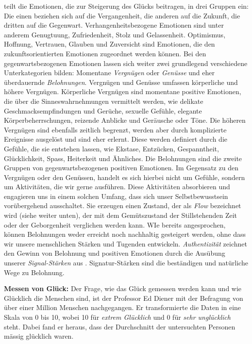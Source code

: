  teilt die Emotionen, die zur Steigerung des Glücks beitragen, in drei Gruppen ein: Die einen beziehen sich auf die Vergangenheit, die anderen auf die Zukunft, die dritten auf die Gegenwart. Verhangenheitsbezogene Emotionen sind unter anderem Genugtuung, Zufriedenheit, Stolz und Gelassenheit. Optimismus, Hoffnung, Vertrauen, Glauben und Zuversicht sind Emotionen, die den zukunftsorientierten Emotionen zugeordnet werden können. Bei den gegenwartsbezogenen Emotionen lassen sich weiter zwei grundlegend verschiedene Unterkategorien bilden: Momentane \textit{Vergnügen} oder \textit{Genüsse} und eher überdauernde \textit{Belohnungen}. Vergnügen und Genüsse umfassen körperliche und höhere Vergnügen. Körperliche Vergnügen sind momentane positive Emotionen, die über die Sinneswahrnehmungen vermittelt werden, wie delikate Geschmacksempfindungen und Gerüche, sexuelle Gefühle, elegante Körperbeherrschungen, reizende Anblicke und Geräusche oder Töne. Die höheren Vergnügen sind ebenfalls zeitlich begrenzt, werden aber durch komplizierte Ereignisse ausgelöst und sind eher erlernt. Diese werden definiert durch die Gefühle, die sie entstehen lassen, wie Ekstase, Entzücken, Gespanntheit, Glücklichkeit, Spass, Heiterkeit und Ähnliches. Die Belohnungen sind die zweite Gruppen von gegenwartsbezogenen positiven Emotionen. Im Gegensatz zu den Vergnügen oder den Genüssen, handelt es sich hierbei nicht um Gefühle, sondern um Aktivitäten, die wir gerne ausführen. Diese Aktivitäten absorbieren und engagieren uns in einem solchen Umfang, dass sich unser Selbstbewusstsein vorübergehend ausschaltet. Sie erzeugen einen Zustand, der als \textit{Flow} bezeichnet wird (siehe weiter unten), der mit dem Gemütszustand der Stillstehenden Zeit oder der Geborgenheit verglichen werden kann. WIe bereits angesprochen, können Belohnungen weder erreicht noch nachhaltig gesteigert werden, ohne dass wir unsere menschlichen Stärken und Tugenden entwickeln. \textit{Authentizität} zeichnet den Gewinn von Belohnung und positiven Emotionen durch die Ausübung unserer \textit{Signal-Stärken} aus \cite{Seligman2003}. Signatur-Stärken sind die beständigen und natürliche Wege zu Belohnung.
\par
\textbf{Messen von Glück:}
Der Frage, wie das Glück gemessen werden kann und wie Glücklich die Menschen sind, ist der Professor Ed Diener \citeyear{Myers:1995} mit der Befragung von über einer Million Menschen nachgegangen. Er transformierte die Daten in eine Skala von 0 bis 10, wobei 10 für \textit{extrem Glücklich} und 0 für \textit{sehr unglücklich} steht. Dabei fand er heraus, dass der Durchschnitt der untersuchten Personen mässig glücklich waren.\\
